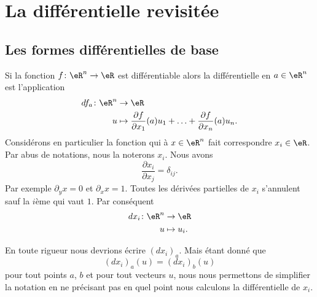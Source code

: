
\section{La différentielle revisitée}

\subsection{Les formes différentielles de base}

Si la fonction $f\colon \eR^n\to \eR$ est différentiable alors la différentielle en $a\in\eR^n$ est l'application
\begin{equation}        \label{EqFormDiffdfah}
    \begin{aligned}
        df_a\colon \eR^n&\to \eR \\
        u&\mapsto \frac{ \partial f }{ \partial x_1 }(a)u_1+\ldots+\frac{ \partial f }{ \partial x_n }(a)u_n.
    \end{aligned}
\end{equation}
Considérons en particulier la fonction qui à $x\in\eR^n$ fait correspondre $x_i\in\eR$. Par abus de notations,  nous la noterons $x_i$. Nous avons 
\begin{equation}
    \frac{ \partial x_i }{ \partial x_j }=\delta_{ij}.
\end{equation}
Par exemple $\partial_yx=0$ et $\partial_xx=1$. Toutes les dérivées partielles de $x_i$ s'annulent sauf la $i$ème qui vaut $1$. Par conséquent
\begin{equation}
    \begin{aligned}
        dx_i\colon \eR^n&\to \eR \\
        u&\mapsto u_i. 
    \end{aligned}
\end{equation}

\begin{remark}
    En toute rigueur nous devrions écrire $(dx_i)_a$. Mais étant donné que
    \begin{equation}
        (dx_i)_a(u)=(dx_i)_b(u)
    \end{equation}
    pour tout points $a$, $b$ et pour tout vecteurs $u$, nous nous permettons de simplifier la notation en ne précisant pas en quel point nous calculons la différentielle de $x_i$.
\end{remark}

